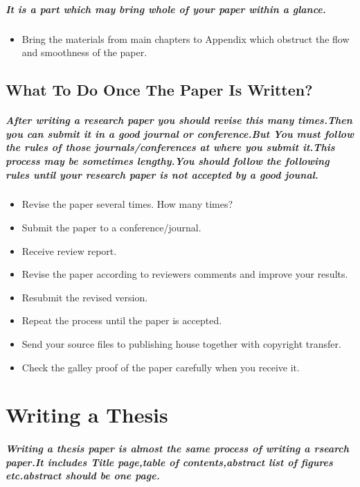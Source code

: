 \documentclass[20pt]{report}
\begin{document}
\paragraph{It is a part which may bring whole of your paper within a glance.}
\begin{itemize}
\item Bring the materials from main chapters to Appendix which
obstruct the flow and smoothness of the paper.
\end{itemize}

\section{What To Do Once The Paper Is Written?}
\paragraph{After writing a research paper you should revise this many times.Then you can submit it in a good journal or conference.But You must follow the rules of those journals/conferences at where you submit it.This process may be sometimes lengthy.You should follow the following rules until your research paper is not accepted by a good jounal.}
\begin{itemize}
\item Revise the paper several times. How many times?
\item Submit the paper to a conference/journal.
\item Receive review report.
\item Revise the paper according to reviewers comments and
improve your results.
\item Resubmit the revised version.
\item Repeat the process until the paper is accepted.
\item Send your source files to publishing house together with
copyright transfer.
\item Check the galley proof of the paper carefully when you
receive it.
\end{itemize}


  \chapter{Writing a Thesis}
  \paragraph{Writing a thesis paper is almost the same process of writing a rsearch paper.It includes Title page,table of contents,abstract list of figures etc.abstract should be one page. }
\end{document}
